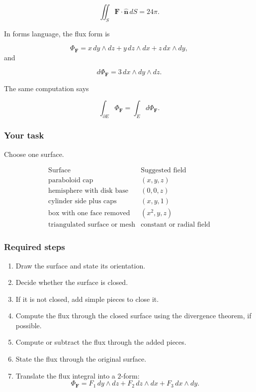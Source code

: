 \[
\boxed{
    \iint_S \mathbf F\cdot\widehat{\mathbf n}\,dS=24\pi.
}
\]

In forms language, the flux form is

\[
    \Phi_{\mathbf F}
    =
    x\,dy\wedge dz
    +
    y\,dz\wedge dx
    +
    z\,dx\wedge dy,
\]
and

\[
    d\Phi_{\mathbf F}
    =
    3\,dx\wedge dy\wedge dz.
\]

The same computation says

\[
    \int_{\partial E}\Phi_{\mathbf F}
    =
    \int_E d\Phi_{\mathbf F}.
\]

\subsubsection*{Your task}

Choose one surface.

\[
\begin{array}{c|c}
\text{Surface} & \text{Suggested field} \\ \hline
\text{paraboloid cap} & (x,y,z)\\[1mm]
\text{hemisphere with disk base} & (0,0,z)\\[1mm]
\text{cylinder side plus caps} & (x,y,1)\\[1mm]
\text{box with one face removed} & (x^2,y,z)\\[1mm]
\text{triangulated surface or mesh} & \text{constant or radial field}
\end{array}
\]

\subsubsection*{Required steps}

\begin{enumerate}
\item Draw the surface and state its orientation.

\item Decide whether the surface is closed.

\item If it is not closed, add simple pieces to close it.

\item Compute the flux through the closed surface using the divergence theorem, if
possible.

\item Compute or subtract the flux through the added pieces.

\item State the flux through the original surface.

\item Translate the flux integral into a \(2\)-form:
\[
    \Phi_{\mathbf F}
    =
    F_1\,dy\wedge dz
    +
    F_2\,dz\wedge dx
    +
    F_3\,dx\wedge dy.
\]
\end{enumerate}

